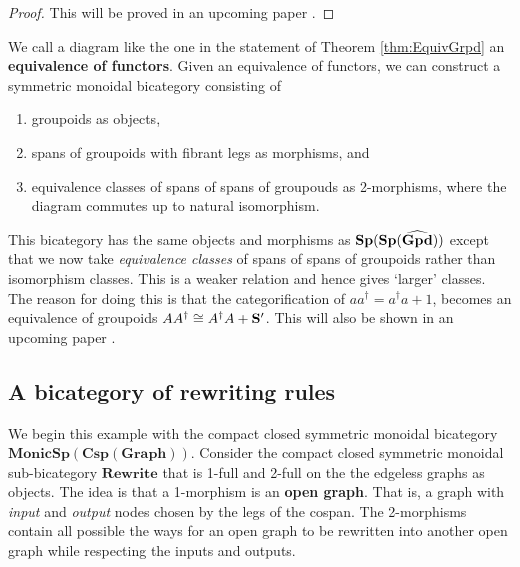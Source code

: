 \documentclass[11pt]{amsart}
\newcommand{\cat}[1]{\mathbf{#1}}
\newcommand{\bimonspcsp}[1]{\mathbf{MonicSp(Csp(#1))}}
\theoremstyle{remark}
\theoremstyle{definition}
\begin{document}
\begin{proof}
	This will be proved in an upcoming paper \cite{CicCour}.
\end{proof}

We call a diagram like the 
one in the statement of Theorem 
	\ref{thm:EquivGrpd}
an \textbf{equivalence of functors}.
Given an equivalence of functors, 
we can construct a 
symmetric monoidal bicategory 
consisting of
\begin{enumerate}
	\item groupoids as objects,
	\item spans of groupoids with 
		fibrant legs as morphisms, and
	\item equivalence classes of
		spans of spans of groupouds 
		as 2-morphisms, where the 
		diagram commutes up to natural isomorphism.
\end{enumerate}
This bicategory has 
the same objects and morphisms as 
	$\bold{Sp(Sp(\widehat{Gpd}))}$ 
except that we now take 
\emph{equivalence classes} of 
spans of spans of groupoids rather than 
isomorphism classes. 
This is a weaker relation 
and hence gives `larger' classes. 
The reason for doing this is that 
the categorification of
	$aa^\dagger = a^\dagger a + 1$, 
becomes an equivalence of groupoids 
	$AA^\dagger \cong A^\dagger A + \bold{S^\prime}$. 
This will also be shown 
in an upcoming paper \cite{CicCour}.

\subsection{A bicategory of rewriting rules} %
\label{subsec:Rewrite}

We begin this example with the 
compact closed symmetric monoidal bicategory 
	$\bimonspcsp{Graph}$.  
Consider the compact closed symmetric monoidal sub-bicategory 
$\cat{Rewrite}$ that is 
1-full and 2-full on the 
the edgeless graphs as objects.
The idea is that a 1-morphism is 
an \textbf{open graph}. 
That is, a graph with 
\emph{input} and \emph{output} nodes 
chosen by the legs of the cospan. 
The 2-morphisms contain 
all possible the ways for an open graph 
to be rewritten into another open graph
while respecting the inputs and outputs. 
\end{document}
